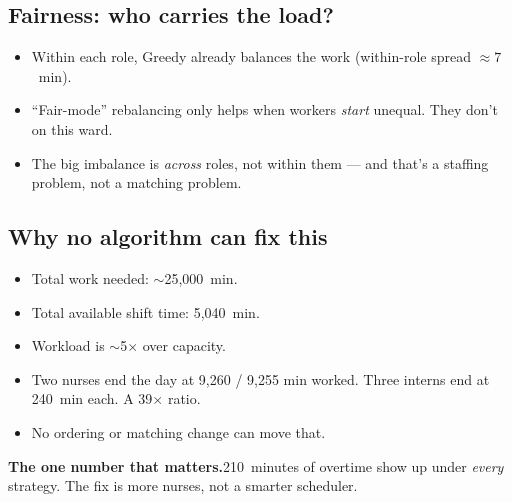 \subsection{Fairness: who carries the load?}

\begin{itemize}
  \item Within each role, Greedy already balances the work
        (within-role spread $\approx 7$~min).
  \item ``Fair-mode'' rebalancing only helps when workers
        \emph{start} unequal. They don't on this ward.
  \item The big imbalance is \emph{across} roles, not within them
        --- and that's a staffing problem, not a matching problem.
\end{itemize}

\subsection{Why no algorithm can fix this}

\begin{itemize}
  \item Total work needed: $\sim$25{,}000~min.
  \item Total available shift time: 5{,}040~min.
  \item Workload is $\sim$5$\times$ over capacity.
  \item Two nurses end the day at 9{,}260 / 9{,}255 min worked.
        Three interns end at 240~min each. A 39$\times$ ratio.
  \item No ordering or matching change can move that.
\end{itemize}

\begin{insightbox}
\textbf{The one number that matters.}210~minutes of overtime show up under \emph{every} strategy.
The fix is more nurses, not a smarter scheduler.
\end{insightbox}

